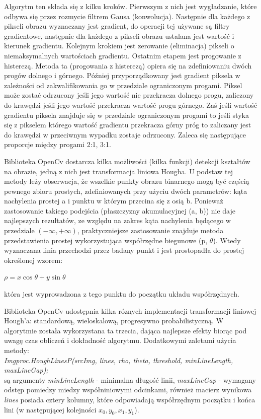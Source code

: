 \documentclass[a4paper,12pt]{article}
\begin{document}
		        Algorytm ten składa się z kilku kroków. Pierwszym z nich jest wygładzanie, które odbywa się przez rozmycie filtrem Gausa (konwolucja). Następnie dla każdego z pikseli obrazu wyznaczany jest gradient, do operacji tej używane są filtry gradientowe, następnie dla każdego z pikseli obrazu ustalana jest wartość i kierunek gradientu. Kolejnym krokiem jest zerowanie (eliminacja) pikseli o niemaksymalnych wartościach gradientu. Ostatnim etapem jest progowanie z histerezą. Metoda ta (progowania z histerezą) opiera się na zdefiniowaniu dwóch progów dolnego i górnego. Później przyporządkowany jest gradient piksela w zależności od zakwalifikowania go w przedziale ograniczonym progami. Piksel może zostać odrzucony jeśli jego wartość nie przekracza dolnego progu, zaliczony do krawędzi jeśli jego wartość przekracza wartość progu górnego. Zaś jeśli wartość gradientu piksela znajduje się w przedziale ograniczonym progami to jeśli styka się z pikselem którego wartość gradientu przekracza górny próg to zaliczany jest do krawędzi w przeciwnym wypadku zostaje odrzucony. Zaleca się następujące proporcje między progami 2:1, 3:1.
		
        		Biblioteka OpenCv dostarcza kilka możliwości (kilka funkcji) detekcji kształtów na obrazie, jedną z nich jest transformacja liniowa Hougha. U podstaw tej metody leży obserwacja, że wszelkie punkty obrazu binarnego mogą być częścią pewnego zbioru prostych, zdefiniowanych przy użyciu dwóch parametrów: kąta nachylenia prostej a i punktu w którym przecina się z osią b. 
		        Ponieważ zastosowanie takiego podejścia (płaszczyzny akumulacyjnej (a, b)) nie daje najlepszych rezultatów, ze względu na zakres kąta nachylenia będącego w przedziale $(-\infty, +\infty)$, praktyczniejsze zastosowanie znajduje metoda przedstawienia prostej wykorzystująca współrzędne biegunowe (p, $\theta$). Wtedy wyznaczana linia przechodzi przez badany punkt i jest prostopadła do prostej określonej wzorem:
		        \begin{center}
		        $\rho = x \cos \theta + y \sin \theta$ 
		        \end{center} 
		        która jest wyprowadzona z tego punktu do początku układu współrzędnych.
		
		        Biblioteka OpenCv udostępnia kilka róznych implementacji transformacji liniowej Hough'a: standardową, wieloskalową, progresywno probabilistyczną.
		        W algorytmie została wykorzystana ta trzecia, dająca najlepsze efekty biorąc pod uwagę czas obliczeń i dokładność algorytmu. Dodatkowymi zaletami użycia metody:\\ \textit {Imgproc.HoughLinesP(srcImg, lines, rho, theta, threshold, minLineLength, maxLineGap);}\\
		        są argumenty \textit{minLineLength} - minimalna długość linii, \textit{maxLineGap} - wymagany odstęp pomiedzy miedzy współniniowymi odcinkami, również macierz wynikowa \textit{lines} posiada cztery kolumny, które odpowiadają współrzędnym początku i końca lini (w następującej kolejności $ x_0, y_0, x_1, y_1 $).
		
\end{document}

